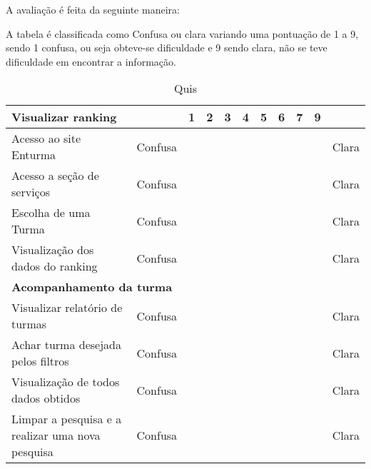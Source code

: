 \begin{itemize}
	A avaliação é feita da seguinte maneira:

		A tabela é classificada como Confusa ou clara variando uma pontuação de 1 a 9, sendo 1 confusa, ou seja  obteve-se dificuldade e 9 sendo clara, não se teve dificuldade em encontrar a informação.

\begin{table}[h]
\centering
\caption{Quis}
\label{my-label}
\begin{tabular}{|l|l|l|l|l|l|l|l|l|l|l|}
\hline
\multicolumn{2}{|l|}{\textbf{Visualizar ranking}}                                                                                         & 1 & 2 & 3 & 4 & 5 & 6 & 7 & 9 &      \\ \hline Acesso ao site Enturma                                                                                                          & Confusa &   &   &   &   &   &   &   &   & Clara \\ \hline
Acesso a seção de serviços                                                                                                      & Confusa &   &   &   &   &   &   &   &   & Clara \\ \hline
Escolha de uma Turma                                                                                                            & Confusa &   &   &   &   &   &   &   &   & Clara \\ \hline
Visualização dos dados do ranking                                                                                               & Confusa &   &   &   &   &   &   &   &   & Clara \\ \hline
\multicolumn{11}{|l|}{\textbf{Acompanhamento da turma}}                                                                                                                           \\ \hline
Visualizar relatório de turmas                                                                                                  & Confusa &   &   &   &   &   &   &   &   & Clara \\ \hline
Achar turma desejada pelos filtros                                                                                              & Confusa &   &   &   &   &   &   &   &   & Clara \\ \hline
Visualização de todos dados obtidos                                                                                             & Confusa &   &   &   &   &   &   &   &   & Clara \\ \hline
Limpar a pesquisa e a realizar uma nova pesquisa                                                                                & Confusa &   &   &   &   &   &   &   &   & Clara \\ \hline

\end{tabular}
\end{table}
\end{itemize}
